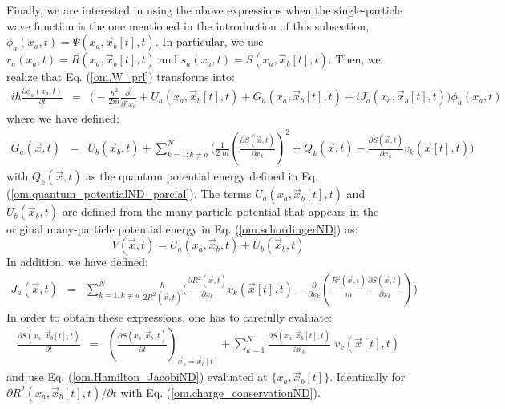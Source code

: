 \documentclass[onecolumn,nofootinbib, secnumarabic, amsmath, nobibnotes,11pt,aps,pra]{revtex4-1}
\newcommand{\eref}[1]{Eq. (\ref{#1})}
\begin{document}
Finally, we are interested in using the above expressions when the single-particle wave function is the one mentioned in the introduction of this subsection, $\phi_a(x_a,t) = \Psi(x_a,\vec x_b[t],t)$. In particular, we use $r_a(x_a,t) = R(x_{a},\vec x_{b}[t],t)$ and $s_a(x_a,t) = S(x_{a},\vec x_{b}[t],t)$. Then, we realize that \eref{om.W_prl} transforms into:
\begin{eqnarray}
\label{om.pseudoscho_prl}
i\hbar\frac{\partial \phi_{a}(x_{a},t)}{\partial t} &=& \bigg( -\frac
{\hbar^2} {2m}\frac {\partial^2}{\partial^2 {x_a}} + U_{a}(x_{a},\vec
x_{b}[t],t)+ G_{a}(x_{a},\vec x_{b}[t],t) + i J_{a}(x_{a},\vec x_{b}[t],t) \bigg) \phi_{a}(x_{a},t)
\end{eqnarray}
where we have defined:
\begin{eqnarray}
\label{om.G_prl}
G_{a}(\vec x,t) &=& U_b(\vec x_{b},t) + \sum_{k = 1;k\neq a}^{N} \Bigg( \frac {1} {2 \; m} \left (\frac {\partial S(\vec x,t)} {\partial x_k} \right)^2+ Q_k(\vec x,t) - \frac {\partial S(\vec x,t)} {\partial x_k} v_k(\vec x[t],t) \Bigg)
\end{eqnarray}
with $Q_k(\vec x,t)$ as the quantum potential energy defined in \eref{om.quantum_potentialND_parcial}. The terms \textit{$U_{a}(x_{a},\vec x_{b}[t],t)$} and \textit{$U_b(\vec x_{b},t)$} are defined from the many-particle potential that appears in the original many-particle potential energy in \eref{om.schordingerND} as:
\begin{equation}
\label{om.U_prl}
V(\vec x,t) = U_{a}(x_{a},\vec x_{b},t) + U_b(\vec x_{b},t)
\end{equation}
In addition, we have defined:
\begin{eqnarray}
\label{om.J_prl}
J_{a}(\vec x,t) &=& \sum_{k = 1;k\neq a}^{N} \frac {\hbar} {2R^2(\vec
x,t)} \Bigg( \frac {\partial R^2(\vec x,t)} {\partial x_k} v_k(\vec
x[t],t) - \frac {\partial} {\partial x_k} \left( \frac {R^2(\vec x,t)} {m} \frac {\partial S(\vec x,t)} {\partial x_k} \right) \Bigg)
\end{eqnarray}
In order to obtain these expressions, one has to carefully evaluate:
\begin{eqnarray}
\label{om.prlpas}
\frac {\partial S(x_a,\vec x_b[t],t)} {\partial t} &=& \left( \frac
{\partial S(x_a,\vec x_b,t)} {\partial t}\right)_{\vec x_b = \vec
x_b[t]}+ \sum_{k = 1}^{N}\frac {\partial S(x_a,\vec x_b[t],t)}{\partial x_k} \; v_k(\vec x[t],t)
\end{eqnarray}
and use \eref{om.Hamilton_JacobiND} evaluated at $\{x_a,\vec x_b[t]\}$. Identically for  $\partial R^2(x_a,\vec x_b[t],t)/\partial t$ with \eref{om.charge_conservationND}.
\end{document}
